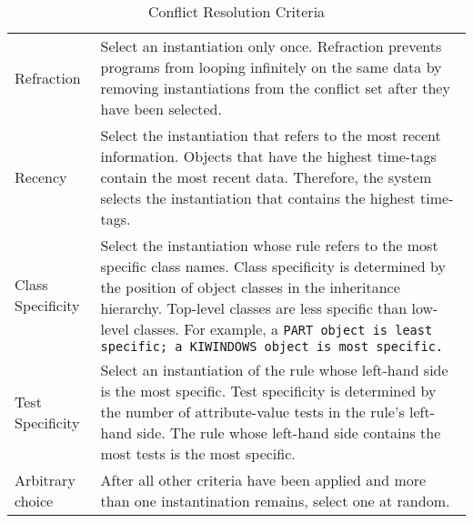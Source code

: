 \begin{table*}[h]
  \def\arraystretch{1.2}
  \begin{tabularx}{\columnwidth}{lX}
    \toprule
    Refraction   & Select an instantiation 
                   only once.               
                   Refraction prevents       
                   programs from looping    
                   infinitely on the same   
                   data by removing         
                   instantiations from the 
                   conflict set after they 
                   have been selected.  \\
    Recency      & Select the instantiation 
                   that refers to the most  
                   recent information.      
                   Objects that have the    
                   highest time-tags contain
                   the most recent data.    
                   Therefore, the system    
                   selects the instantiation 
                   that contains the highest
                   time-tags.              \\
    Class Specificity & Select the instantiation 
                        whose rule refers to the 
                        most specific class      
                        names.                   
                        Class specificity is     
                        determined by the        
                        position of object       
                        classes in the           
                        inheritance hierarchy.  
                        Top-level classes are    
                        less specific than       
                        low-level classes. For   
                        example, a \tt{PART} object is 
                        least specific; a        
                        \tt{KIWINDOWS} object is most 
                        specific. \\
    Test Specificity &  Select an instantiation 
                       of the rule whose        
                       left-hand side is the    
                       most specific.          
                       Test specificity is     
                       determined by the number 
                       of attribute-value tests 
                       in the rule's left-hand  
                       side. The rule whose     
                       left-hand side contains 
                       the most tests is the    
                       most specific. \\
    Arbitrary choice &  After all other criteria 
                       have been applied and   
                       more than one            
                       instantination remains,  
                       select one at random. \\
    \bottomrule
  \end{tabularx}
  \caption{Conflict Resolution Criteria}
  \label{t:crc}
\end{table*}

